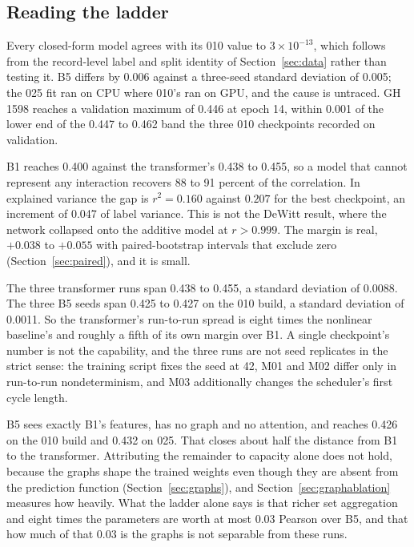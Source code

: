 \subsection{Reading the ladder}

Every closed-form model agrees with its 010 value to $3 \times 10^{-13}$, which
follows from the record-level label and split identity of Section~\ref{sec:data}
rather than testing it. B5 differs by 0.006 against a three-seed standard deviation
of 0.005; the 025 fit ran on CPU where 010's ran on GPU, and the cause is untraced.
GH 1598 reaches a validation maximum of 0.446 at epoch 14, within 0.001 of the lower
end of the 0.447 to 0.462 band the three 010 checkpoints recorded on validation.

B1 reaches 0.400 against the transformer's 0.438 to 0.455, so a model that cannot
represent any interaction recovers 88 to 91 percent of the correlation. In explained
variance the gap is $r^2 = 0.160$ against $0.207$ for the best checkpoint, an
increment of 0.047 of label variance. This is not the DeWitt result, where the
network collapsed onto the additive model at $r > 0.999$. The margin is real,
$+0.038$ to $+0.055$ with paired-bootstrap intervals that exclude
zero\iflong{} (Section~\ref{sec:paired})\fi, and it is small.

\iflong
{}
The three transformer runs span 0.438 to 0.455, a standard deviation of 0.0088.
The three B5 seeds span 0.425 to 0.427 on the 010 build, a standard deviation of
0.0011. So the transformer's run-to-run spread is eight times the nonlinear
baseline's and roughly a fifth of its own margin over B1. A single checkpoint's
number is not the capability, and the three runs are not seed replicates in the
strict sense: the training script fixes the seed at 42, M01 and M02 differ only in
run-to-run nondeterminism, and M03 additionally changes the scheduler's first
cycle length.

B5 sees exactly B1's features, has no graph and no attention, and reaches 0.426 on
the 010 build and 0.432 on 025. That closes about half the distance from B1 to the
transformer. Attributing the remainder to capacity alone does not hold, because the
graphs shape the trained weights even though they are absent from the prediction
function (Section~\ref{sec:graphs}), and Section~\ref{sec:graphablation} measures
how heavily. What the ladder alone says is that richer set aggregation and eight
times the parameters are worth at most 0.03 Pearson over B5, and that how much of
that 0.03 is the graphs is not separable from these runs.

